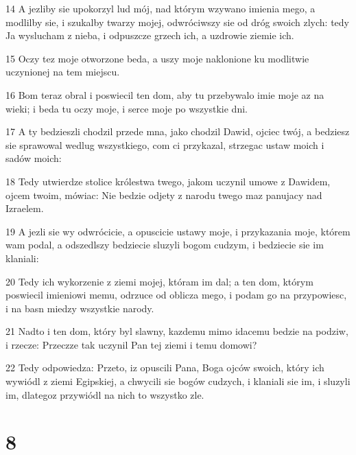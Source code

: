 \par 14 A jezliby sie upokorzyl lud mój, nad którym wzywano imienia mego, a modlilby sie, i szukalby twarzy mojej, odwróciwszy sie od dróg swoich zlych: tedy Ja wyslucham z nieba, i odpuszcze grzech ich, a uzdrowie ziemie ich.
\par 15 Oczy tez moje otworzone beda, a uszy moje naklonione ku modlitwie uczynionej na tem miejscu.
\par 16 Bom teraz obral i poswiecil ten dom, aby tu przebywalo imie moje az na wieki; i beda tu oczy moje, i serce moje po wszystkie dni.
\par 17 A ty bedzieszli chodzil przede mna, jako chodzil Dawid, ojciec twój, a bedziesz sie sprawowal wedlug wszystkiego, com ci przykazal, strzegac ustaw moich i sadów moich:
\par 18 Tedy utwierdze stolice królestwa twego, jakom uczynil umowe z Dawidem, ojcem twoim, mówiac: Nie bedzie odjety z narodu twego maz panujacy nad Izraelem.
\par 19 A jezli sie wy odwrócicie, a opuscicie ustawy moje, i przykazania moje, którem wam podal, a odszedlszy bedziecie sluzyli bogom cudzym, i bedziecie sie im klaniali:
\par 20 Tedy ich wykorzenie z ziemi mojej, któram im dal; a ten dom, którym poswiecil imieniowi memu, odrzuce od oblicza mego, i podam go na przypowiesc, i na basn miedzy wszystkie narody.
\par 21 Nadto i ten dom, który byl slawny, kazdemu mimo idacemu bedzie na podziw, i rzecze: Przeczze tak uczynil Pan tej ziemi i temu domowi?
\par 22 Tedy odpowiedza: Przeto, iz opuscili Pana, Boga ojców swoich, który ich wywiódl z ziemi Egipskiej, a chwycili sie bogów cudzych, i klaniali sie im, i sluzyli im, dlategoz przywiódl na nich to wszystko zle.

\chapter{8}

